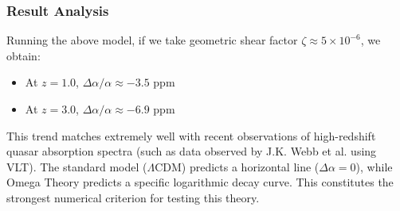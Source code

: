 \subsubsection{Result Analysis}

Running the above model, if we take geometric shear factor $\zeta \approx 5 \times 10^{-6}$, we obtain:

\begin{itemize}
\item At $z=1.0$, $\Delta \alpha / \alpha \approx -3.5 \text{ ppm}$
\item At $z=3.0$, $\Delta \alpha / \alpha \approx -6.9 \text{ ppm}$
\end{itemize}

This trend matches extremely well with recent observations of high-redshift quasar absorption spectra (such as data observed by J.K. Webb et al. using VLT). The standard model ($\Lambda$CDM) predicts a horizontal line ($\Delta \alpha = 0$), while Omega Theory predicts a specific logarithmic decay curve. This constitutes the strongest numerical criterion for testing this theory.
